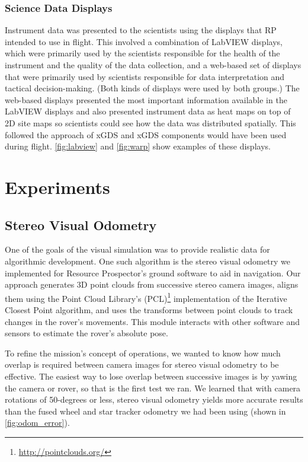 \documentclass[twocolumn,letterpaper]{IEEEAerospaceCLS}  %
\begin{document}
\subsubsection{Science Data Displays}
Instrument data was presented to the scientists using the displays that RP intended to use in flight.  
This involved a combination of LabVIEW displays, which were primarily used by the scientists responsible for the health of the instrument and the quality of the data collection, and a web-based set of displays \cite{OpenMCT} that were primarily used by scientists responsible for data interpretation and tactical decision-making.  
(Both kinds of displays were used by both groups.)  The web-based displays presented the most important information available in the LabVIEW displays and also presented instrument data as heat maps on top of 2D site maps so scientists could see how the data was distributed spatially.  
This followed the approach of xGDS \cite{lee2013reusable} and xGDS components would have been used during flight.  \cref{fig:labview} and  \cref{fig:warp} show examples of these displays.

\section{Experiments}

\subsection{Stereo Visual Odometry}
One of the goals of the visual simulation was to provide realistic data for algorithmic development.  One such algorithm is the stereo visual odometry we implemented for Resource Prospector's ground software to aid in navigation.
Our approach generates 3D point clouds from successive stereo camera images, aligns them using the Point Cloud Library's (PCL)\footnote{\url{http://pointclouds.org/}} implementation of the Iterative Closest Point algorithm, and uses the transforms between point clouds to track changes in the rover's movements.  This module interacts with other software and sensors to estimate the rover's absolute pose.

To refine the mission's concept of operations, we wanted to know how much overlap is required between camera images for stereo visual odometry to be effective.  
The easiest way to lose overlap between successive images is by yawing the camera or rover, so that is the first test we ran.  
We learned that with camera rotations of 50-degrees or less, stereo visual odometry yields more accurate results than the fused wheel and star tracker odometry we had been using (shown in \cref{fig:odom_error}).
\end{document}
